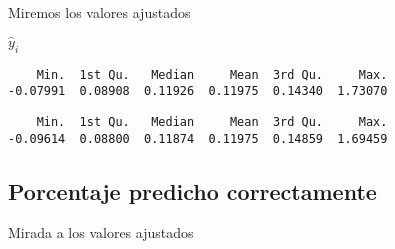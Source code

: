 \documentclass[
  letterpaper,
  DIV=11,
  numbers=noendperiod]{scrreprt}
\newenvironment{Shaded}{\begin{snugshade}}{\end{snugshade}}
\newcommand{\CommentTok}[1]{\textcolor[rgb]{0.37,0.37,0.37}{#1}}
\newcommand{\FunctionTok}[1]{\textcolor[rgb]{0.28,0.35,0.67}{#1}}
\newcommand{\NormalTok}[1]{\textcolor[rgb]{0.00,0.23,0.31}{#1}}
\newcommand{\SpecialCharTok}[1]{\textcolor[rgb]{0.37,0.37,0.37}{#1}}
\begin{document}
Miremos los valores ajustados

\(\widehat{y}_i\)

\begin{Shaded}
\end{Shaded}

\begin{verbatim}
    Min.  1st Qu.   Median     Mean  3rd Qu.     Max. 
-0.07991  0.08908  0.11926  0.11975  0.14340  1.73070 
\end{verbatim}

\begin{Shaded}
\end{Shaded}

\begin{verbatim}
    Min.  1st Qu.   Median     Mean  3rd Qu.     Max. 
-0.09614  0.08800  0.11874  0.11975  0.14859  1.69459 
\end{verbatim}

\subsection{Porcentaje predicho
correctamente}\label{porcentaje-predicho-correctamente}

Mirada a los valores ajustados

\begin{Shaded}
\end{Shaded}
\end{document}
